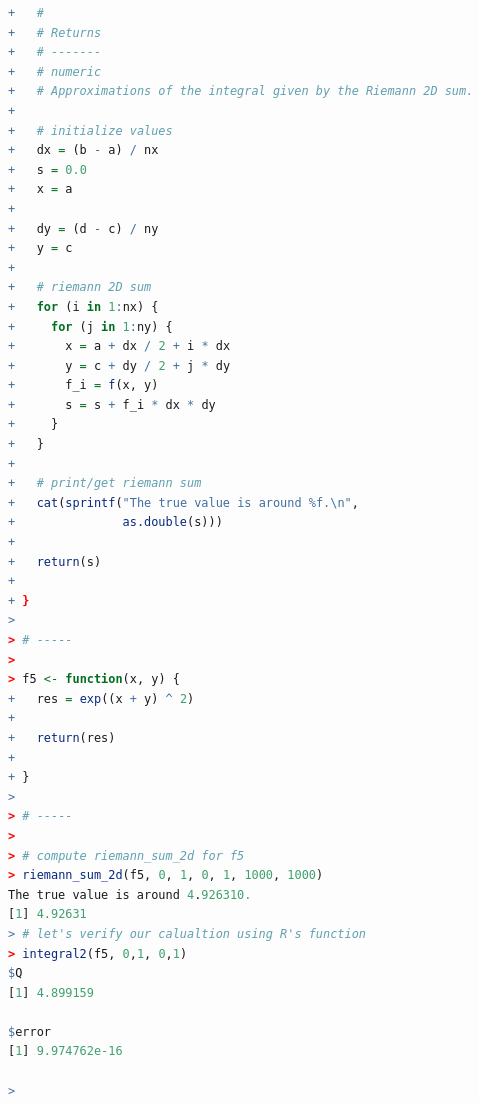 \documentclass[11pt,a4paper]{article}
\begin{document}
\begin{lstlisting}[frame=trBL, language=R]
+   #
+   # Returns
+   # -------
+   # numeric
+   # Approximations of the integral given by the Riemann 2D sum.
+   
+   # initialize values
+   dx = (b - a) / nx
+   s = 0.0
+   x = a
+   
+   dy = (d - c) / ny
+   y = c
+   
+   # riemann 2D sum
+   for (i in 1:nx) {
+     for (j in 1:ny) {
+       x = a + dx / 2 + i * dx
+       y = c + dy / 2 + j * dy
+       f_i = f(x, y)
+       s = s + f_i * dx * dy
+     }
+   }
+   
+   # print/get riemann sum
+   cat(sprintf("The true value is around %f.\n",
+               as.double(s)))
+   
+   return(s)
+   
+ }
> 
> # -----
> 
> f5 <- function(x, y) {
+   res = exp((x + y) ^ 2)
+   
+   return(res)
+   
+ }
> 
> # -----
> 
> # compute riemann_sum_2d for f5
> riemann_sum_2d(f5, 0, 1, 0, 1, 1000, 1000)
The true value is around 4.926310.
[1] 4.92631
> # let's verify our calualtion using R's function
> integral2(f5, 0,1, 0,1)
$Q
[1] 4.899159

$error
[1] 9.974762e-16

> 
\end{lstlisting}

\clearpage

\end{document}
